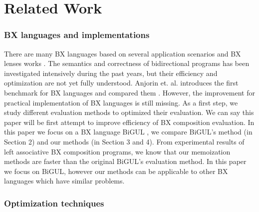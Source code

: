 \section{Related Work}

\subsubsection*{BX languages and implementations}

There are many BX languages \cite{Buchmann:2018:BFI:3362232.3362263,Ko:2016:BFV:2847538.2847544,LeblebiciAS14,Samimi-Dehkordi18,Cicchetti2011,Hinkel:2019:CPB:3318595.3318634}
based on several application scenarios and BX lenses works \cite{Bohannon06relationallenses:, Bohannon:2008:BRL:1328438.1328487}. The semantics and correctness of bidirectional programs has been investigated intensively during the past years, but their efficiency and optimization are not yet fully understood. Anjorin et. al. introduces the first benchmark for BX languages and compared them \cite{Anjorin2019}. However, the improvement for practical implementation of BX languages is still missing. As a first step, we study different evaluation methods to optimized their evaluation. We can say this paper will be first attempt to improve efficiency of BX composition evaluation. In this paper we focus on a BX language BiGUL \cite{Ko:2016:BFV:2847538.2847544, Ko:2017:ABB:3177123.3158129}, we compare BiGUL's method (in Section 2) and our methods (in Section 3 and 4). From experimental results of left associative BX composition programs, we know that our memoization methods are faster than the original BiGUL's evaluation method.
In this paper we focus on BiGUL, however our methods can be applicable to other BX languages which have similar problems.


\subsubsection*{Optimization techniques}

